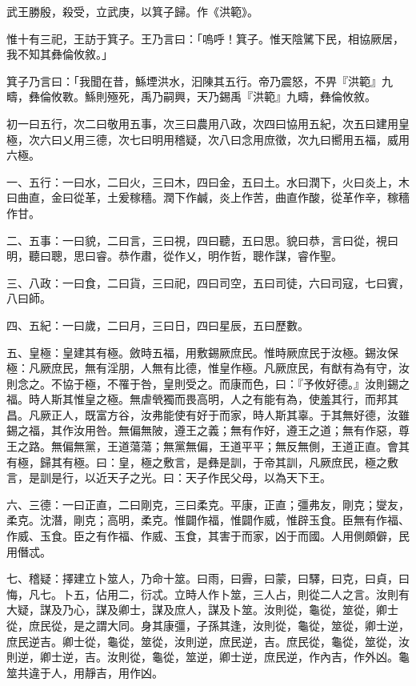 
\begin{pinyinscope}
武王勝殷，殺受，立武庚，以箕子歸。作《洪範》。

惟十有三祀，王訪于箕子。王乃言曰：「嗚呼！箕子。惟天陰騭下民，相協厥居，我不知其彝倫攸敘。」

箕子乃言曰：「我聞在昔，鯀堙洪水，汩陳其五行。帝乃震怒，不畀『洪範』九疇，彝倫攸斁。鯀則殛死，禹乃嗣興，天乃錫禹『洪範』九疇，彝倫攸敘。

初一曰五行，次二曰敬用五事，次三曰農用八政，次四曰協用五紀，次五曰建用皇極，次六曰乂用三德，次七曰明用稽疑，次八曰念用庶徵，次九曰嚮用五福，威用六極。

一、五行：一曰水，二曰火，三曰木，四曰金，五曰土。水曰潤下，火曰炎上，木曰曲直，金曰從革，土爰稼穡。潤下作鹹，炎上作苦，曲直作酸，從革作辛，稼穡作甘。

二、五事：一曰貌，二曰言，三曰視，四曰聽，五曰思。貌曰恭，言曰從，視曰明，聽曰聰，思曰睿。恭作肅，從作乂，明作哲，聰作謀，睿作聖。

三、八政：一曰食，二曰貨，三曰祀，四曰司空，五曰司徒，六曰司寇，七曰賓，八曰師。

四、五紀：一曰歲，二曰月，三曰日，四曰星辰，五曰歷數。

五、皇極：皇建其有極。斂時五福，用敷錫厥庶民。惟時厥庶民于汝極。錫汝保極：凡厥庶民，無有淫朋，人無有比德，惟皇作極。凡厥庶民，有猷有為有守，汝則念之。不協于極，不罹于咎，皇則受之。而康而色，曰：『予攸好德。』汝則錫之福。時人斯其惟皇之極。無虐煢獨而畏高明，人之有能有為，使羞其行，而邦其昌。凡厥正人，既富方谷，汝弗能使有好于而家，時人斯其辜。于其無好德，汝雖錫之福，其作汝用咎。無偏無陂，遵王之義；無有作好，遵王之道；無有作惡，尊王之路。無偏無黨，王道蕩蕩；無黨無偏，王道平平；無反無側，王道正直。會其有極，歸其有極。曰：皇，極之敷言，是彝是訓，于帝其訓，凡厥庶民，極之敷言，是訓是行，以近天子之光。曰：天子作民父母，以為天下王。

六、三德：一曰正直，二曰剛克，三曰柔克。平康，正直；彊弗友，剛克；燮友，柔克。沈潛，剛克；高明，柔克。惟闢作福，惟闢作威，惟辟玉食。臣無有作福、作威、玉食。臣之有作福、作威、玉食，其害于而家，凶于而國。人用側頗僻，民用僭忒。

七、稽疑：擇建立卜筮人，乃命十筮。曰雨，曰霽，曰蒙，曰驛，曰克，曰貞，曰悔，凡七。卜五，佔用二，衍忒。立時人作卜筮，三人占，則從二人之言。汝則有大疑，謀及乃心，謀及卿士，謀及庶人，謀及卜筮。汝則從，龜從，筮從，卿士從，庶民從，是之謂大同。身其康彊，子孫其逢，汝則從，龜從，筮從，卿士逆，庶民逆吉。卿士從，龜從，筮從，汝則逆，庶民逆，吉。庶民從，龜從，筮從，汝則逆，卿士逆，吉。汝則從，龜從，筮逆，卿士逆，庶民逆，作內吉，作外凶。龜筮共違于人，用靜吉，用作凶。


\end{pinyinscope}
